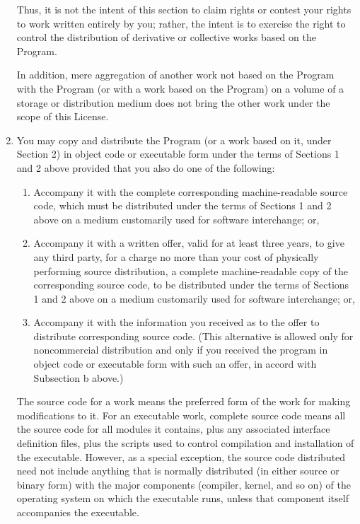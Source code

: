\begin{lrbox}{\gpl}
\begin{minipage}{3\textwidth}
\begin{multicols}{3}
\begin{enumerate}
Thus, it is not the intent of this section to claim rights or contest
your rights to work written entirely by you; rather, the intent is to
exercise the right to control the distribution of derivative or
collective works based on the Program.

In addition, mere aggregation of another work not based on the Program
with the Program (or with a work based on the Program) on a volume of
a storage or distribution medium does not bring the other work under
the scope of this License.

\item
You may copy and distribute the Program (or a work based on it,
under Section 2) in object code or executable form under the terms of
Sections 1 and 2 above provided that you also do one of the following:

\begin{enumerate}

\item

Accompany it with the complete corresponding machine-readable
source code, which must be distributed under the terms of Sections
1 and 2 above on a medium customarily used for software interchange; or,

\item

Accompany it with a written offer, valid for at least three
years, to give any third party, for a charge no more than your
cost of physically performing source distribution, a complete
machine-readable copy of the corresponding source code, to be
distributed under the terms of Sections 1 and 2 above on a medium
customarily used for software interchange; or,

\item

Accompany it with the information you received as to the offer
to distribute corresponding source code.  (This alternative is
allowed only for noncommercial distribution and only if you
received the program in object code or executable form with such
an offer, in accord with Subsection b above.)

\end{enumerate}


The source code for a work means the preferred form of the work for
making modifications to it.  For an executable work, complete source
code means all the source code for all modules it contains, plus any
associated interface definition files, plus the scripts used to
control compilation and installation of the executable.  However, as a
special exception, the source code distributed need not include
anything that is normally distributed (in either source or binary
form) with the major components (compiler, kernel, and so on) of the
operating system on which the executable runs, unless that component
itself accompanies the executable.


\end{enumerate}
\end{multicols}
\end{minipage}
\end{lrbox}
